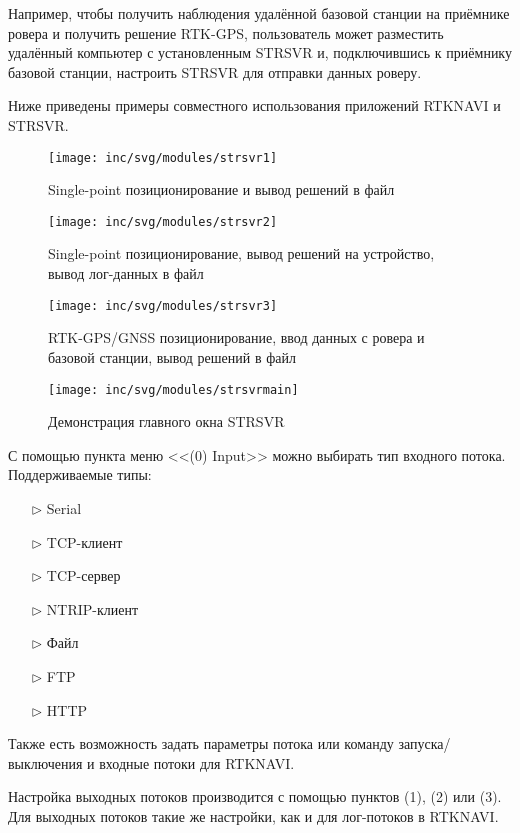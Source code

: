 Например, чтобы получить наблюдения удалённой базовой станции на приёмнике ровера и получить решение RTK-GPS, пользователь может разместить удалённый компьютер с установленным STRSVR и, подключившись к приёмнику базовой станции, настроить STRSVR для отправки данных роверу.


Ниже приведены примеры совместного использования приложений RTKNAVI и STRSVR.
\begin{figure}[ht]
	\centering
	\texttt{[image: inc/svg/modules/strsvr1]}
	\caption{Single-point позиционирование и вывод решений в файл}
	\label{fig:strsvr1}
\end{figure}
\begin{figure}[ht]
	\centering
	\texttt{[image: inc/svg/modules/strsvr2]}
	\caption{Single-point позиционирование, вывод решений на устройство, вывод лог-данных в файл}
	\label{fig:strsvr2}
\end{figure}
\begin{figure}[h!]
	\centering
	\texttt{[image: inc/svg/modules/strsvr3]}
	\caption{RTK-GPS/GNSS позиционирование, ввод данных с ровера и базовой станции, вывод решений в файл}
	\label{fig:strsvr3}
\end{figure}
\FloatBarrier
\begin{figure}[ht]
	\centering
	\texttt{[image: inc/svg/modules/strsvrmain]}
	\caption{Демонстрация главного окна STRSVR}
	\label{fig:strsvrmain}
\end{figure}

С помощью пункта меню <<(0) Input>> можно выбирать тип входного потока. Поддерживаемые типы:
\begin{itemize}
	\item[$\triangleright$] Serial
	\item[$\triangleright$] TCP-клиент
	\item[$\triangleright$] TCP-сервер
	\item[$\triangleright$] NTRIP-клиент
	\item[$\triangleright$] Файл
	\item[$\triangleright$] FTP
	\item[$\triangleright$] HTTP
\end{itemize}
Также есть возможность задать параметры потока или команду запуска/выключения и входные потоки для RTKNAVI.

Настройка выходных потоков производится с помощью пунктов (1), (2) или (3). Для выходных потоков такие же настройки, как и для лог-потоков в RTKNAVI.

